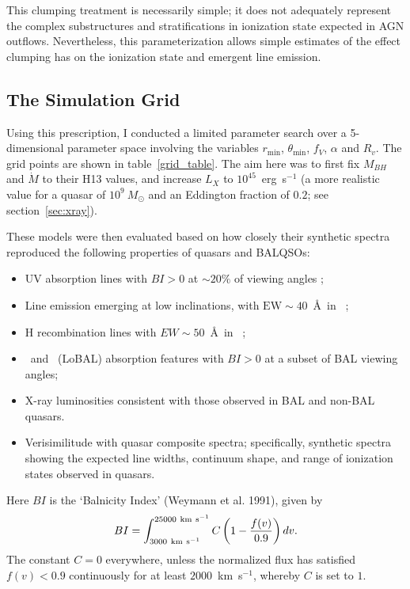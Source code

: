 This clumping treatment is necessarily simple; it does not adequately
represent the complex substructures and stratifications in ionization
state expected in AGN outflows. 
Nevertheless, this parameterization 
allows simple estimates of the effect clumping has on the ionization 
state and emergent line emission.


\subsection{The Simulation Grid}
\label{sec:sim_grid}
Using this prescription, I conducted a limited parameter
search over a 5-dimensional parameter space involving the 
variables $r_{\mathrm{min}}$, $\theta_{\mathrm{min}}$, $f_V$, $\alpha$ and $R_v$.
The grid points are shown in table~\ref{grid_table}.
The aim here was to first fix $M_{BH}$ and $\dot{M}$ to their H13 values,
and increase $L_X$ to $10^{45}$~erg~s$^{-1}$ (a more realistic value for a 
quasar of $10^9~M_\odot$ and an Eddington fraction of $0.2$; see section~\ref{sec:xray}).

These models were then evaluated based on 
how closely their synthetic spectra reproduced the 
following properties of quasars and BALQSOs:

\begin{itemize}
\item UV absorption lines 
with $BI > 0$ at $\sim20\%$ of viewing angles \cite[e.g.][]{knigge2008};
\item Line emission emerging at low inclinations, with $\mathrm{EW}\sim40$~\AA\ in \civline\ \citep[e.g. ][]{shen2011};
\item H recombination lines with $EW\sim50$~\AA\ in \la\ \citep[e.g.][]{shen2011};
\item \mg\ and \al\ (LoBAL) absorption features with $BI > 0$ at a subset of 
BAL viewing angles;
\item X-ray luminosities consistent with those observed in BAL and non-BAL
quasars.
\item Verisimilitude with quasar composite spectra; specifically, synthetic spectra showing
the expected line widths, continuum shape, and range of ionization states observed
in quasars.
\end{itemize}
Here $BI$ is the `Balnicity Index' (Weymann et al. 1991), given by
\begin{equation}
BI = \int^{25000~{\rm km~s}^{-1}}_{3000~{\rm km~s}^{-1}} C \left( 1 - \frac{f(v)}{0.9} \right) dv.
\end{equation}
The constant $C=0$ everywhere, unless the normalized flux
has satisfied $f(v)<0.9$ continuously for at least $2000$~km~s$^{−1}$, 
whereby $C$ is set to $1$.

